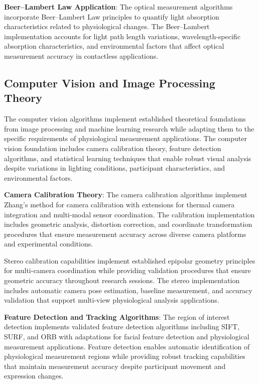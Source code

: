 \documentclass[11pt,a4paper]{report}
\begin{document}
\noindent \textbf{Beer–Lambert Law Application}: The optical measurement algorithms incorporate Beer–Lambert Law principles to quantify light absorption characteristics related to physiological changes. The Beer–Lambert implementation accounts for light path length variations, wavelength-specific absorption characteristics, and environmental factors that affect optical measurement accuracy in contactless applications.

\subsection{Computer Vision and Image Processing Theory}

The computer vision algorithms implement established theoretical foundations from image processing and machine learning research while adapting them to the specific requirements of physiological measurement applications. The computer vision foundation includes camera calibration theory, feature detection algorithms, and statistical learning techniques that enable robust visual analysis despite variations in lighting conditions, participant characteristics, and environmental factors.

\noindent \textbf{Camera Calibration Theory}: The camera calibration algorithms implement Zhang's method for camera calibration with extensions for thermal camera integration and multi-modal sensor coordination. The calibration implementation includes geometric analysis, distortion correction, and coordinate transformation procedures that ensure measurement accuracy across diverse camera platforms and experimental conditions.

Stereo calibration capabilities implement established epipolar geometry principles for multi-camera coordination while providing validation procedures that ensure geometric accuracy throughout research sessions. The stereo implementation includes automatic camera pose estimation, baseline measurement, and accuracy validation that support multi-view physiological analysis applications.

\noindent \textbf{Feature Detection and Tracking Algorithms}: The region of interest detection implements validated feature detection algorithms including SIFT, SURF, and ORB with adaptations for facial feature detection and physiological measurement applications. Feature detection enables automatic identification of physiological measurement regions while providing robust tracking capabilities that maintain measurement accuracy despite participant movement and expression changes.
\end{document}
